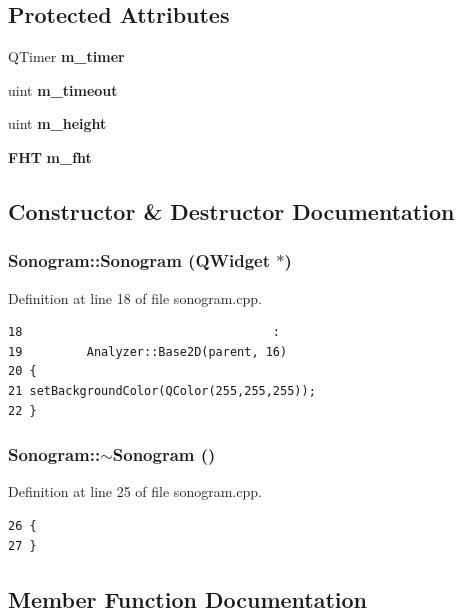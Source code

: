 \subsection*{Protected Attributes}
\begin{CompactItemize}
\item 
QTimer {\bf m\_\-timer}
\item 
uint {\bf m\_\-timeout}
\item 
uint {\bf m\_\-height}
\item 
{\bf FHT} {\bf m\_\-fht}
\end{CompactItemize}


\subsection{Constructor \& Destructor Documentation}
\subsubsection{\setlength{\rightskip}{0pt plus 5cm}Sonogram::Sonogram ({\bf QWidget} $\ast$)}\label{classSonogram_Sonograma0}




Definition at line 18 of file sonogram.cpp.



\footnotesize\begin{verbatim}18                                   :
19         Analyzer::Base2D(parent, 16)
20 {
21 setBackgroundColor(QColor(255,255,255));
22 }

\end{verbatim}\normalsize 
{}
\subsubsection{\setlength{\rightskip}{0pt plus 5cm}Sonogram::$\sim${\bf Sonogram} ()}\label{classSonogram_Sonograma1}




Definition at line 25 of file sonogram.cpp.



\footnotesize\begin{verbatim}26 {
27 }
\end{verbatim}\normalsize 


\subsection{Member Function Documentation}
